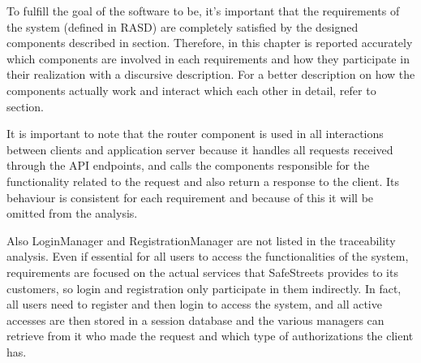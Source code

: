 To fulfill the goal of the software to be, it's important that the requirements of the system (defined in RASD) are completely satisfied by the designed components described in \hyperref[sec:components]{\color{blue}{component view}} section. Therefore, in this chapter is reported accurately which components are involved in each requirements and how they participate in their realization with a discursive description. For a better description on how the components actually work and interact which each other in detail, refer to \hyperref[sec:components]{\color{blue}{component view}} section.

It is important to note that the router component is used in all interactions between clients and application server because it handles all requests received through the API endpoints, and calls the components responsible for the functionality related to the request and also return a response to the client. Its behaviour is consistent for each requirement and because of this it will be omitted from the analysis.

Also LoginManager and RegistrationManager are not listed in the traceability analysis. Even if essential for all users to access the functionalities of the system, requirements are focused on the actual services that SafeStreets provides to its customers, so login and registration only participate in them indirectly. In fact, all users need to register and then login to access the system, and all active accesses are then stored in a session database and the various managers can retrieve from it who made the request and which type of authorizations the client has.

